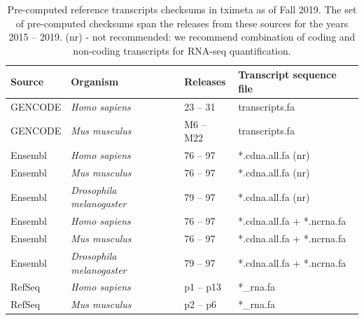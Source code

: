 \documentclass[12pt]{article} \usepackage[utf8]{inputenc}
\begin{document}
\begin{table}[t]
\centering
\begin{tabular}{llll} 
\hline Source & Organism & Releases & Transcript sequence file
\\ \hline\hline GENCODE & \textit{Homo sapiens} & 23 -- 31 &
transcripts.fa \\ GENCODE & \textit{Mus musculus} & M6 -- M22 &
transcripts.fa \\ \hline Ensembl & \textit{Homo sapiens} & 76 -- 97 &
*.cdna.all.fa (nr) \\ Ensembl & \textit{Mus musculus} & 76 -- 97 &
*.cdna.all.fa (nr) \\ Ensembl & \textit{Drosophila melanogaster} & 79
-- 97 & *.cdna.all.fa (nr) \\ \hline Ensembl & \textit{Homo sapiens} &
76 -- 97 & *.cdna.all.fa + *.ncrna.fa \\ Ensembl & \textit{Mus
  musculus} & 76 -- 97 & *.cdna.all.fa + *.ncrna.fa \\ Ensembl &
\textit{Drosophila melanogaster} & 79 -- 97 & *.cdna.all.fa +
*.ncrna.fa \\ \hline RefSeq & \textit{Homo sapiens} & p1 -- p13 &
*\_rna.fa \\ RefSeq & \textit{Mus musculus} & p2 -- p6 & *\_rna.fa
\\ \hline
\end{tabular}
\caption{Pre-computed reference transcripts checksums in tximeta as of
  Fall 2019. The set of pre-computed checksums span the releases from
  these sources for the years 2015 -- 2019. (nr) - not recommended: we
  recommend combination of coding and non-coding transcripts for
  RNA-seq quantification.}
\label{tab1}
\end{table}
\end{document}
